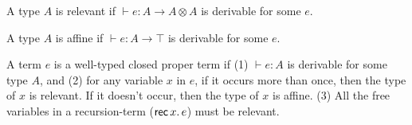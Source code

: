 \documentclass[10pt,a4]{article}
\begin{document}
\normalsize

A type \( A \) is relevant if \( \vdash e : A \to A \otimes A \) is derivable for some \( e \).

A type \( A \) is affine if \( \vdash e : A \to \top \) is derivable for some \( e \).

A term \( e \) is a well-typed closed proper term if (1) \( \vdash e : A \) is derivable for some type \( A \), and (2) for any variable \( x \) in \( e \), if it occurs more than once, then the type of \( x \) is relevant. If it doesn't occur, then the type of \( x \) is affine. (3) All the free variables in a recursion-term (\( \mathsf{rec}\,x.\,e \)) must be relevant.



\end{document}
